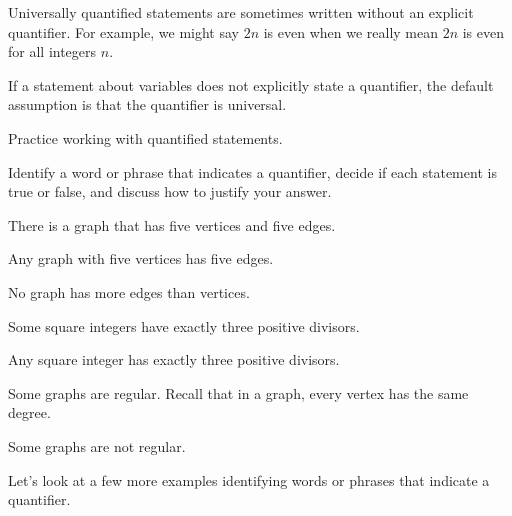 Universally quantified statements are sometimes written without an explicit quantifier.  For example, we might say $2n$ is even when we really mean $2n$ is even for all integers $n$.

\begin{rem}
\label{rem_default_universal} 
    If a statement about variables does not explicitly state a quantifier, the default assumption is that the quantifier is universal.  
\end{rem}

Practice working with quantified statements.

\begin{act}
\label{act_TorF_again}
    Identify a word or phrase that indicates a quantifier, decide if each statement is true or false, and discuss how to justify your answer. 
        \begin{actpart}
            \item \label{part_exists_5vert_5edge} There is a graph that has five vertices and five edges. %
            \item \label{part_forall_5vert_5edge} Any graph with five vertices has five edges.%
            \item \label{part_more_edges_than_verts} No graph has more edges than vertices. %
            \item \label{part_sq_has3div} Some square integers have exactly three positive divisors. %
            \item \label{part_sq_ex3div} Any square integer has exactly three positive divisors. %
            \item \label{part_regular_graph} Some graphs are regular.  Recall that in a  graph, every vertex has the same degree. %
            \item \label{part_not_regular_graphs} Some graphs are not regular. %
        \end{actpart}
\end{act}

Let's look at a few more examples identifying words or phrases that indicate a quantifier.

